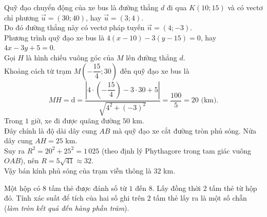 \begin{ex}
{		Quỹ đạo chuyển động của xe bus là đường thẳng $d$ đi qua $K(10;15)$ và có vectơ chỉ phương $\overrightarrow{u}=(30;40)$, hay $\overrightarrow{u}=(3;4)$.\\
		Do đó đường thẳng này có vectơ pháp tuyến $\overrightarrow{n}=(4;-3)$.\\
		Phương trình quỹ đạo xe bus là $4(x-10)-3(y-15)=0$, hay $4x-3y+5=0$.\\
		Gọi $H$ là hình chiếu vuông góc của $M$ lên đường thẳng $d$.\\
		Khoảng cách từ trạm $M\left(-\dfrac{15}{4};30\right)$ đến quỹ đạo xe bus là
		$$MH= \mathrm{d}=\dfrac{\left|4\cdot\left(-\dfrac{15}{4}\right)-3\cdot30+5\right|}{\sqrt{4^2+(-3)^2}}=\dfrac{100}{5}=20 \text{ (km)}.$$
		Trong $1$ giờ, xe đi được quãng đường $50$ km.\\
		Đây chính là độ dài dây cung $AB$ mà quỹ đạo xe cắt đường tròn phủ sóng. Nửa dây cung $AH=25$ km.\\
		Suy ra $R^2=20^2+25^2=1\,025$ (theo định lý Phythagore trong tam giác vuông $OAB$), nên $R=5\sqrt{41}\approx 32$.\\
		Vậy bán kính phủ sóng của trạm viễn thông là $32$ km.
	}
\end{ex}
\begin{ex}%
	Một hộp có $8$ tấm thẻ được đánh số từ $1$ đến $8$. Lấy đồng thời $2$ tấm thẻ từ hộp đó. Tính xác suất để tích của hai số ghi trên $2$ tấm thẻ lấy ra là một số chẵn (\textit{làm tròn kết quả đến hàng phần trăm}).
\end{ex}
